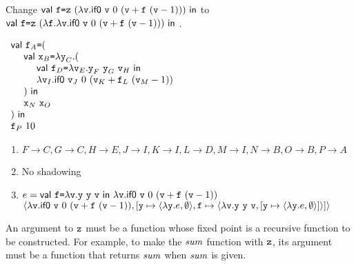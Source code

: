 \textbf{}

Change $\textsf{val}\ \texttt{f}\texttt{=}\texttt{z}\ ({\lambda\texttt{v}.\textsf{if0}\ \texttt{v}\ 0\ (\texttt{v}+\texttt{f}\ (\texttt{v}-1))})\ \textsf{in}\ $to
$\textsf{val}\ \texttt{f}\texttt{=}\texttt{z}\ ({\lambda\texttt{f}.\lambda\texttt{v}.\textsf{if0}\ \texttt{v}\ 0\ (\texttt{v}+\texttt{f}\ (\texttt{v}-1))})\ \textsf{in}\ $\!.
\\

\textbf{}

$\begin{array}{l}
  \ebind{\cf_A}{(\\
  \ \ \ \ \ebind{\cx_B}{\efun{\cy_C}{(\\
  \ \ \ \ \ \ \ \ \ebind{\cf_D}{\efun{\cv_E}{\eapp{\eapp{\cy_F}{\cy_G}}{\cv_H}}}{\\
  \ \ \ \ \ \ \ \ \efun{\cv_I}{\eifz{\cv_J}{0}{(\eadd{\cv_K}{\eapp{\cf_L}{(\esub{\cv_M}{1})}})}}}\\
  \ \ \ \ )}}{\\
  \ \ \ \ \eapp{\cx_N}{\cx_O}\\
  )}}{\\
  \eapp{\cf_P}{10}
  }
\end{array}$
\begin{enumerate}
  \item $F\rightarrow C,G\rightarrow C,H\rightarrow E,J\rightarrow I,
    K\rightarrow I,L\rightarrow D,M\rightarrow I,N\rightarrow B,
    O\rightarrow B,P\rightarrow A$
  \item No shadowing
  \item
    $e={\textsf{val}\ \texttt{f}\texttt{=}\lambda\texttt{v}.\texttt{y}\ \texttt{y}\ \texttt{v}\ \textsf{in}\ \lambda\texttt{v}.\textsf{if0}\ \texttt{v}\ 0\ (\texttt{v}+\texttt{f}\ (\texttt{v}-1))}$
    \\
    $\langle\lambda\texttt{v}.\textsf{if0}\ \texttt{v}\ 0\ (\texttt{v}+\texttt{f}\ (\texttt{v}-1)),[
      \texttt{y}\mapsto\langle\lambda\texttt{y}.e,\emptyset\rangle,
      \texttt{f}\mapsto\langle\lambda\texttt{v}.\texttt{y}\ \texttt{y}\ \texttt{v},[\texttt{y}\mapsto\langle\lambda\texttt{y}.e,\emptyset\rangle]\rangle
    ]\rangle$

\end{enumerate}

\textbf{}

An argument to $\texttt{z}$ must be a function whose fixed point is a recursive function
to be constructed. For example, to make the $\mbox{\emph{sum}}$ function with $\texttt{z}$,
its argument must be a function that returns $\mbox{\emph{sum}}$ when $\mbox{\emph{sum}}$ is
given.
\\

\textbf{}

